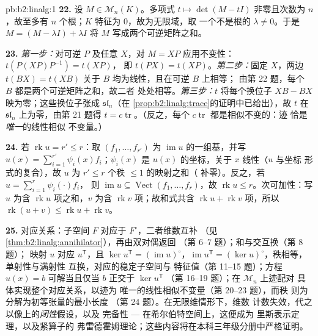 \begin{solution}{pb:b2:linalg:1}
\textbf{22.} 设 $M \in \mathcal{M}_n(K)$。多项式 $t
\mapsto \det(M - tI)$ 非零且次数为 $n$，故至多有
$n$ 个根；$K$ 特征为 $0$，故为无限域，取
一个不是根的 $\lambda \neq 0$。于是 $M = (M - \lambda I) +
\lambda I$ 将 $M$ 写成两个可逆矩阵之和。

\textbf{23.} \emph{第一步：}对可逆 $P$ 及任意
$X$，对 $M = XP$ 应用不变性：$t(P(XP)P^{-1}) = t(XP)$，
即 $t(PX) = t(XP)$。\emph{第二步：}固定 $X$，两边
$t(BX) = t(XB)$ 关于 $B$ 均为线性，且在可逆 $B$ 上相等；
由第 22 题，每个 $B$ 都是两个可逆矩阵之和，故二者
处处相等。\emph{第三步：}$t$ 将每个换位子 $XB
- BX$ 映为零；这些换位子张成 $\mathfrak{sl}_n$（在
\cref{prop:b2:linalg:trace}的证明中已给出），故 $t$ 在
$\mathfrak{sl}_n$ 上为零，由第 21 题得 $t =
c\operatorname{tr}$。（反之，每个 $c\operatorname{tr}$ 都是相似不变的：迹
恰是\emph{唯一}的线性相似
不变量。）

\textbf{24.} 若 $\operatorname{rk} u = r' \leq r$：取
$(f_1, \dots, f_{r'})$ 为 $\operatorname{im} u$ 的一组基，并写 $u(x)
= \sum_{i=1}^{r'} \psi_i(x) f_i$；$\psi_i(x)$ 是
$u(x)$ 的坐标，关于 $x$ 线性（$u$ 与坐标
形式的复合），故 $u$ 为 $r' \leq r$ 个秩 $\leq1$ 的映射之和（
补零）。反之，若 $u = \sum_{i=1}^r \psi_i(\cdot)f_i$，
则 $\operatorname{im} u \subseteq \operatorname{Vect}(f_1,
\dots, f_r)$，故 $\operatorname{rk} u \leq r$。次可加性：写
$u$ 为含 $\operatorname{rk} u$ 项之和，$v$ 为含
$\operatorname{rk} v$ 项；故和式共含 $\operatorname{rk} u +
\operatorname{rk} v$ 项，所以 $\operatorname{rk}(u + v) \leq
\operatorname{rk} u + \operatorname{rk} v$。

\textbf{25.} 对应关系：子空间 $F$ 对应于
$F^\circ$，二者维数互补
（见\cref{thm:b2:linalg:annihilator}），再由双对偶返回
（第 6--7 题）；和与交互换（第 8 题）；
映射 $u$ 对应 $u^{\mathsf T}$，且 $\ker u^{\mathsf T}
= (\operatorname{im}u)^\circ$，$\operatorname{im}u^{\mathsf T} =
(\ker u)^\circ$，秩相等，单射性与满射性
互换，对应的稳定子空间与
特征值（第 11--15 题）；方程 $u(x) = b$
可解当且仅当 $b$ 正交于 $\ker u^{\mathsf T}$
（第 16--19 题）；在 $\mathcal{M}_n$ 上迹配对
具体实现整个对应关系，以迹为
唯一的线性相似不变量（第 20--23 题），而秩
则为分解为初等张量的最小长度
（第 24 题）。在无限维情形下，维数
计数失效，代之以像上的\emph{闭性}假设，以及
完备性 --- 在希尔伯特空间上，这便成为
里斯表示定理，以及紧算子的
弗雷德霍姆理论；这些内容将在本科三年级分册中严格证明。
\end{solution}
